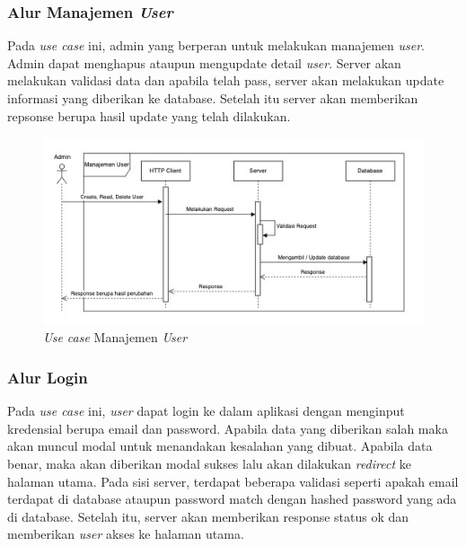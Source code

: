 \subsubsection{Alur Manajemen \textit{User}}

Pada \textit{use case} ini, admin yang berperan untuk melakukan manajemen \textit{user}. Admin dapat menghapus ataupun mengupdate detail \textit{user}. Server akan melakukan validasi data dan apabila telah pass, server akan melakukan update informasi yang diberikan ke database. Setelah itu server akan memberikan repsonse berupa hasil update yang telah dilakukan.

\begin{figure}[h]
  \centering
  \includegraphics[width=1\textwidth]{resources/chapter-3/usecase/uc-04.jpg}
  \caption{\textit{Use case} Manajemen \textit{User}}
  \label{fig:usecase-04}
\end{figure}

\subsubsection{Alur Login}

Pada \textit{use case} ini, \textit{user} dapat login ke dalam aplikasi dengan menginput kredensial berupa email dan password. Apabila data yang diberikan salah maka akan muncul modal untuk menandakan kesalahan yang dibuat. Apabila data benar, maka akan diberikan modal sukses lalu akan dilakukan \textit{redirect} ke halaman utama. Pada sisi server, terdapat beberapa validasi seperti apakah email terdapat di database ataupun password match dengan hashed password yang ada di database. Setelah itu, server akan memberikan response status ok dan memberikan \textit{user} akses ke halaman utama.


